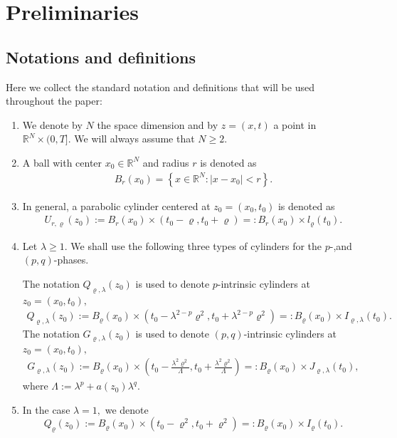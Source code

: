 \documentclass[10pt,a4paper]{amsart}
\numberwithin{equation}{section}
\newcommand{\la}{\lambda}
\newcommand{\RR}{\mathds{R}}
\begin{document}
 \section{Preliminaries}
 \subsection{Notations and definitions}\label{notations and definitions} Here we collect the standard notation and definitions  that will be used throughout the paper:
\begin{enumerate}[label=(\roman*),series=theoremconditions]
\item \label{not1} We denote by $N$ the space dimension and by $z=(x,t)$ a point in $ \RR^N\times (0,T]$. We will always assume that $N \geq 2$.   
\item\label{not2} A ball with center $x_0 \in \RR^N$ and radius $r$ is denoted as
 \begin{align*}
     B_r(x_0)=\left\{x \in \RR^N : |x-x_0|<r\right\}.
 \end{align*}
\item\label{general cylinder} In general, a parabolic cylinder centered at $z_0=(x_0, t_0)$ is denoted as 
\begin{align*}
    U_{r, \varrho}(z_0):=B_r(x_0)\times \left(t_0-\varrho, t_0+\varrho\right)=:B_r(x_0)\times l_{\varrho}(t_0).
\end{align*}

\item\label{not5} Let $\lambda\geq 1.$ We shall use the following three types of cylinders for the $p$-,and $(p, q)$-phases. 

\noindent The notation $Q_{\varrho, \lambda}(z_0)$ is used to denote $p$-intrinsic cylinders at $z_0=(x_0, t_0),$
\begin{align*}
Q_{\varrho, \lambda}(z_0):=B_{\varrho}(x_0)\times \left(t_0-\lambda^{2-p}\varrho^2, t_0+\lambda^{2-p}\varrho^2\right)
=:B_{\varrho}(x_0)\times I_{\varrho, \lambda}(t_0).
\end{align*}
The notation $G_{\varrho, \lambda}(z_0)$ is used to denote $(p,q)$-intrinsic cylinders at $z_0=(x_0, t_0),$
\begin{align*}
G_{\varrho, \lambda}(z_0):=B_{\varrho}(x_0)\times \left(t_0-\frac{\lambda^{2}\varrho^2}{\Lambda}, t_0+\frac{\lambda^{2}\varrho^2}{\Lambda}\right)
=:B_{\varrho}(x_0)\times J_{\varrho, \lambda}(t_0),
\end{align*}
where $\Lambda:=\lambda^p+a(z_0)\lambda^q.$
\item \label{not5.5} In the case $\la =1,$ we denote 
\[
Q_\varrho(z_0) := B_{\varrho}(x_0) \times (t_0 - \varrho^2,t_0+\varrho^2) =: B_\varrho(x_0) \times I_\varrho(t_0).
\]



\end{enumerate}
\end{document}
